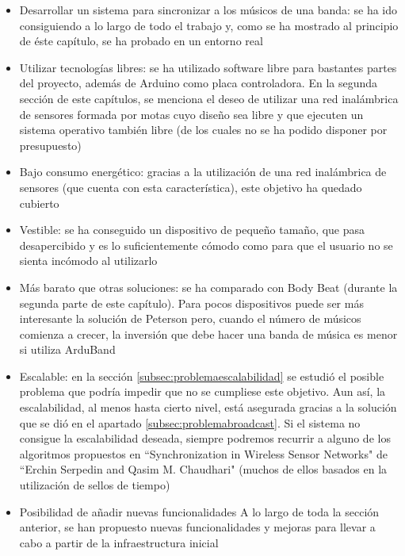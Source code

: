 \begin{itemize}
  \item Desarrollar un sistema para sincronizar a los músicos de una banda:
    se ha ido consiguiendo a lo largo de todo el trabajo y, como se ha mostrado al principio
    de éste capítulo, se ha probado en un entorno real
  \item Utilizar tecnologías libres:
    se ha utilizado software libre para bastantes partes del proyecto, además de Arduino
    como placa controladora. En la segunda sección de este capítulos, se menciona el deseo de utilizar
    una red inalámbrica de sensores formada por motas cuyo diseño sea libre y que ejecuten un sistema operativo
    también libre (de los cuales no se ha podido disponer por presupuesto)
  \item Bajo consumo energético:
    gracias a la utilización de una red inalámbrica de sensores (que cuenta con esta característica),
     este objetivo ha quedado cubierto
  \item Vestible:
    se ha conseguido un dispositivo de pequeño tamaño, que pasa desapercibido y es lo suficientemente
    cómodo como para que el usuario no se sienta incómodo al utilizarlo
  \item Más barato que otras soluciones:
    se ha comparado con Body Beat (durante la segunda parte de este capítulo). Para pocos dispositivos
    puede ser más interesante la solución de Peterson pero, cuando el número de músicos comienza a
    crecer, la inversión que debe hacer una banda de música es menor si utiliza ArduBand
  \item Escalable:
    en la sección \ref{subsec:problemaescalabilidad} se estudió el posible  problema que podría impedir
    que no se cumpliese este objetivo. Aun así, la escalabilidad, al menos hasta cierto nivel, está asegurada
    gracias a la solución que se dió en el apartado \ref{subsec:problemabroadcast}. Si el sistema no consigue
    la escalabilidad deseada, siempre podremos recurrir a alguno de los algoritmos propuestos en ``Synchronization
    in Wireless Sensor Networks" de ``Erchin Serpedin and Qasim M. Chaudhari" \cite{serpedin} (muchos de ellos basados
    en la utilización de sellos de tiempo)
  \item Posibilidad de añadir nuevas funcionalidades
    A lo largo de toda la sección anterior, se han propuesto nuevas funcionalidades y mejoras para llevar
    a cabo a partir de la infraestructura inicial
\end{itemize}
